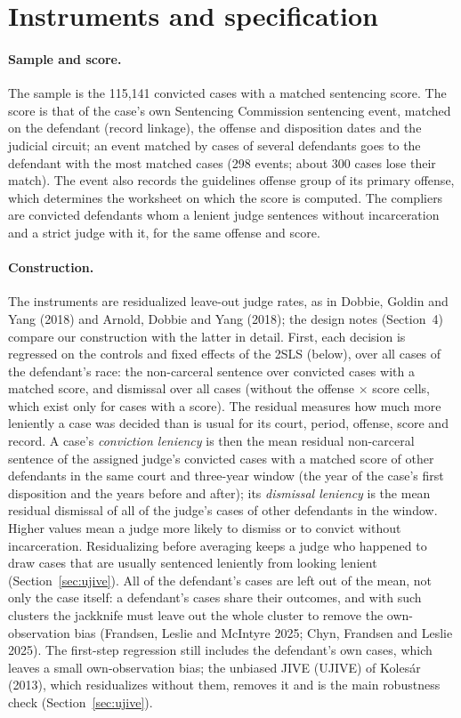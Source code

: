 \documentclass[11pt]{article}
\begin{document}
\section{Instruments and specification}\label{sec:instruments}

\paragraph{Sample and score.} The sample is the 115,141 convicted cases with a matched sentencing score. The score is that of the case's own Sentencing Commission sentencing event, matched on the defendant (record linkage), the offense and disposition dates and the judicial circuit; an event matched by cases of several defendants goes to the defendant with the most matched cases (298 events; about 300 cases lose their match). The event also records the guidelines offense group of its primary offense, which determines the worksheet on which the score is computed. The compliers are convicted defendants whom a lenient judge sentences without incarceration and a strict judge with it, for the same offense and score.

\paragraph{Construction.} The instruments are residualized leave-out judge rates, as in Dobbie, Goldin and Yang (2018) and Arnold, Dobbie and Yang (2018); the design notes (Section~4) compare our construction with the latter in detail. First, each decision is regressed on the controls and fixed effects of the 2SLS (below), over all cases of the defendant's race: the non-carceral sentence over convicted cases with a matched score, and dismissal over all cases (without the offense $\times$ score cells, which exist only for cases with a score). The residual measures how much more leniently a case was decided than is usual for its court, period, offense, score and record. A case's \emph{conviction leniency} is then the mean residual non-carceral sentence of the assigned judge's convicted cases with a matched score of other defendants in the same court and three-year window (the year of the case's first disposition and the years before and after); its \emph{dismissal leniency} is the mean residual dismissal of all of the judge's cases of other defendants in the window. Higher values mean a judge more likely to dismiss or to convict without incarceration. Residualizing before averaging keeps a judge who happened to draw cases that are usually sentenced leniently from looking lenient (Section~\ref{sec:ujive}). All of the defendant's cases are left out of the mean, not only the case itself: a defendant's cases share their outcomes, and with such clusters the jackknife must leave out the whole cluster to remove the own-observation bias (Frandsen, Leslie and McIntyre 2025; Chyn, Frandsen and Leslie 2025). The first-step regression still includes the defendant's own cases, which leaves a small own-observation bias; the unbiased JIVE (UJIVE) of Kolesár (2013), which residualizes without them, removes it and is the main robustness check (Section~\ref{sec:ujive}).
\end{document}
